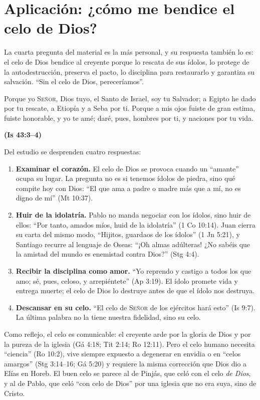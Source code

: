 \documentclass[11pt,letterpaper]{article}
\newcommand{\SENOR}{\textsc{Señor}}
\newcommand{\fuente}[1]{\par\hfill{\upshape\bfseries\small\textcolor{azul}{#1}}}
\begin{document}
\section{Aplicación: ¿cómo me bendice el celo de Dios?}

La cuarta pregunta del material es la más personal, y su respuesta también lo es: el celo de Dios bendice al creyente porque lo rescata de sus ídolos, lo protege de la autodestrucción, preserva el pacto, lo disciplina para restaurarlo y garantiza su salvación. ``Sin el celo de Dios, pereceríamos''.

\begin{cita}Porque yo \SENOR, Dios tuyo, el Santo de Israel, soy tu Salvador; a Egipto he dado por tu rescate, a Etiopía y a Seba por ti. Porque a mis ojos fuiste de gran estima, fuiste honorable, y yo te amé; daré, pues, hombres por ti, y naciones por tu vida.\fuente{(Is 43:3--4)}\end{cita}

Del estudio se desprenden cuatro respuestas:

\begin{enumerate}
\item \textbf{Examinar el corazón.} El celo de Dios se provoca cuando un ``amante'' ocupa su lugar. La pregunta no es si tenemos ídolos de piedra, sino qué compite hoy con Dios: ``El que ama a padre o madre más que a mí, no es digno de mí'' (Mt 10:37).
\item \textbf{Huir de la idolatría.} Pablo no manda negociar con los ídolos, sino huir de ellos: ``Por tanto, amados míos, huid de la idolatría'' (1 Co 10:14). Juan cierra su carta del mismo modo, ``Hijitos, guardaos de los ídolos'' (1 Jn 5:21), y Santiago recurre al lenguaje de Oseas: ``¡Oh almas adúlteras! ¿No sabéis que la amistad del mundo es enemistad contra Dios?'' (Stg 4:4).
\item \textbf{Recibir la disciplina como amor.} ``Yo reprendo y castigo a todos los que amo; sé, pues, celoso, y arrepiéntete'' (Ap 3:19). El ídolo promete vida y entrega muerte; el celo de Dios lo destruye antes de que el ídolo nos destruya.
\item \textbf{Descansar en su celo.} ``El celo de \SENOR{} de los ejércitos hará esto'' (Is 9:7). La última palabra no la tiene nuestra fidelidad, sino su celo.
\end{enumerate}

Como reflejo, el celo es comunicable: el creyente arde por la gloria de Dios y por la pureza de la iglesia (Gá 4:18; Tit 2:14; Ro 12:11). Pero el celo humano necesita ``ciencia'' (Ro 10:2), vive siempre expuesto a degenerar en envidia o en ``celos amargos'' (Stg 3:14--16; Gá 5:20) y requiere la misma corrección que Dios dio a Elías en Horeb. El buen celo se parece al de Pinjás, que celó con el celo \emph{de Dios}, y al de Pablo, que celó ``con celo de Dios'' por una iglesia que no era suya, sino de Cristo.
\end{document}
